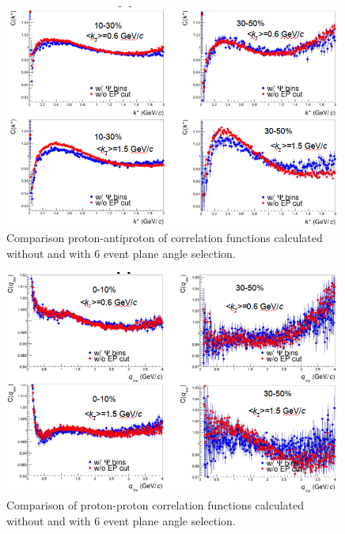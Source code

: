 \begin{figure}%
  \centering
  \includegraphics[width=0.99\textwidth]{pappsi}
  \caption{Comparison proton-antiproton of correlation functions calculated without and with 6 event plane angle selection.}
  \label{pappsi}
\end{figure}
\begin{figure}%
  \centering
  \includegraphics[width=0.99\textwidth]{pppsi}
  \caption{Comparison of proton-proton correlation functions calculated without and with 6 event plane angle selection.}
  \label{pppsi}
\end{figure}
